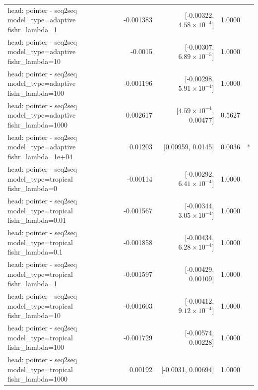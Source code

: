 \documentclass[10pt]{article}
\makeatletter
\newcommand{\stackcell}[1]{\begin{tabular}[t]{@{}l@{}}#1\end{tabular}}
\makeatother
\begin{document}
{\begin{longtable}{lrrrl}
\stackcell{head: pointer - seq2seq\\\footnotesize model\_type=adaptive fishr\_lambda=1 } & -0.001383 & [-0.00322, $4.58\times10^{-4}$] & 1.0000 & \\
\stackcell{head: pointer - seq2seq\\\footnotesize model\_type=adaptive fishr\_lambda=10 } & -0.0015 & [-0.00307, $6.89\times10^{-5}$] & 1.0000 & \\
\stackcell{head: pointer - seq2seq\\\footnotesize model\_type=adaptive fishr\_lambda=100 } & -0.001196 & [-0.00298, $5.91\times10^{-4}$] & 1.0000 & \\
\stackcell{head: pointer - seq2seq\\\footnotesize model\_type=adaptive fishr\_lambda=1000 } & 0.002617 & [$4.59\times10^{-4}$, 0.00477] & 0.5627 & \\
\stackcell{head: pointer - seq2seq\\\footnotesize model\_type=adaptive fishr\_lambda=1e+04 } & 0.01203 & [0.00959, 0.0145] & 0.0036 & *\\
\stackcell{head: pointer - seq2seq\\\footnotesize model\_type=tropical fishr\_lambda=0 } & -0.00114 & [-0.00292, $6.41\times10^{-4}$] & 1.0000 & \\
\stackcell{head: pointer - seq2seq\\\footnotesize model\_type=tropical fishr\_lambda=0.01 } & -0.001567 & [-0.00344, $3.05\times10^{-4}$] & 1.0000 & \\
\stackcell{head: pointer - seq2seq\\\footnotesize model\_type=tropical fishr\_lambda=0.1 } & -0.001858 & [-0.00434, $6.28\times10^{-4}$] & 1.0000 & \\
\stackcell{head: pointer - seq2seq\\\footnotesize model\_type=tropical fishr\_lambda=1 } & -0.001597 & [-0.00429, 0.00109] & 1.0000 & \\
\stackcell{head: pointer - seq2seq\\\footnotesize model\_type=tropical fishr\_lambda=10 } & -0.001603 & [-0.00412, $9.12\times10^{-4}$] & 1.0000 & \\
\stackcell{head: pointer - seq2seq\\\footnotesize model\_type=tropical fishr\_lambda=100 } & -0.001729 & [-0.00574, 0.00228] & 1.0000 & \\
\stackcell{head: pointer - seq2seq\\\footnotesize model\_type=tropical fishr\_lambda=1000 } & 0.00192 & [-0.0031, 0.00694] & 1.0000 & \\

\end{longtable}}
\end{document}
